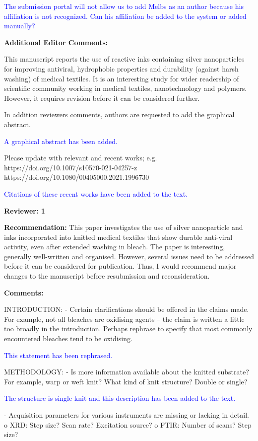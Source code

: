 \documentclass[12pt]{letter}
\newcommand{\blue}[1]{\textcolor{blue}{#1}} %
\begin{document}
\blue{The submission portal will not allow us to  add Melbs as an author because his affiliation is not recognized. Can his affiliation be added to the system or added manually?}

\textbf{Additional Editor Comments:}

This manuscript reports the use of reactive inks containing silver nanoparticles for improving antiviral, hydrophobic properties and durability (against harsh washing) of medical textiles. It is an interesting study for wider readership of scientific community working in medical textiles, nanotechnology and polymers. However, it requires revision before it can be considered further.

In addition reviewers comments, authors are requested to add the graphical abstract.

\blue{A graphical abstract has been added.}

Please update with relevant and recent works; e.g.
https://doi.org/10.1007/s10570-021-04257-z
https://doi.org/10.1080/00405000.2021.1996730

\blue{Citations of these recent works have been added to the text.}

\textbf{Reviewer: 1}

\textbf{Recommendation:} This paper investigates the use of silver nanoparticle and inks incorporated into knitted medical textiles that show durable anti-viral activity, even after extended washing in bleach. 
The paper is interesting, generally well-written and organised. 
However, several issues need to be addressed before it can be considered for publication. Thus, I would recommend major changes to the manuscript before resubmission and reconsideration.

\textbf{Comments:}

INTRODUCTION:
- Certain clarifications should be offered in the claims made. For example, not all bleaches are oxidising agents – the claim is written a little too broadly in the introduction. Perhaps rephrase to specify that most commonly encountered bleaches tend to be oxidising.

\blue{This statement has been rephrased.}

METHODOLOGY:
- Is more information available about the knitted substrate? For example, warp or weft knit? What kind of knit structure? Double or single?

\blue{The structure is single knit and this description has been added to the text.}

- Acquisition parameters for various instruments are missing or lacking in detail.
o XRD: Step size? Scan rate? Excitation source?
o FTIR: Number of scans? Step size?
\end{document}
